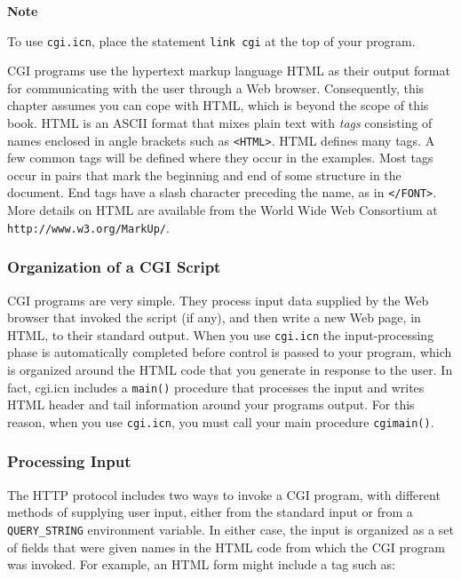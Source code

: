 {\sffamily\bfseries Note}

{\sffamily To use \texttt{cgi.icn}, place the statement \texttt{link cgi}
at the top of your program.

CGI programs use the hypertext markup language HTML as their output
format for communicating with the user through a Web browser.
Consequently, this chapter assumes you can cope with HTML, which is
beyond the scope of this book. HTML is an ASCII format that mixes plain
text with \textit{tags} consisting of names enclosed in angle brackets
such as \texttt{{\textless}HTML{\textgreater}}. HTML defines many tags.
A few common tags will be defined where they occur in the examples.
Most tags occur in pairs that mark the beginning and end of some
structure in the document. End tags have a slash character preceding
the name, as in \texttt{{\textless}/FONT{\textgreater}}. More details
on HTML are available from the World Wide Web Consortium at
\texttt{http://www.w3.org/MarkUp/}.

\subsubsection[Organization of a CGI Script]{Organization of a CGI
Script}
CGI programs are very simple. They process input data supplied by the
Web browser that invoked the script (if any), and then write a new Web
page, in HTML, to their standard output. When you use \texttt{cgi.icn}
the input-processing phase is automatically completed before control is
passed to your program, which is organized around the HTML code that
you generate in response to the user. In fact, cgi.icn includes a
\texttt{main()} procedure that processes the input and writes HTML
header and tail information around your program{\textquotesingle}s
output. For this reason,
when you use \texttt{cgi.icn}, you must call your main procedure
\texttt{cgimain()}.

\subsubsection{Processing Input}

The HTTP protocol includes two ways to invoke a CGI program,
with different methods of supplying user input, either from the
standard input or from a \texttt{QUERY\_STRING} environment variable.
In either case, the input is organized as a set of fields that were
given names in the HTML code from which the CGI program was invoked.
For example, an HTML form might include a tag such as: 

}
